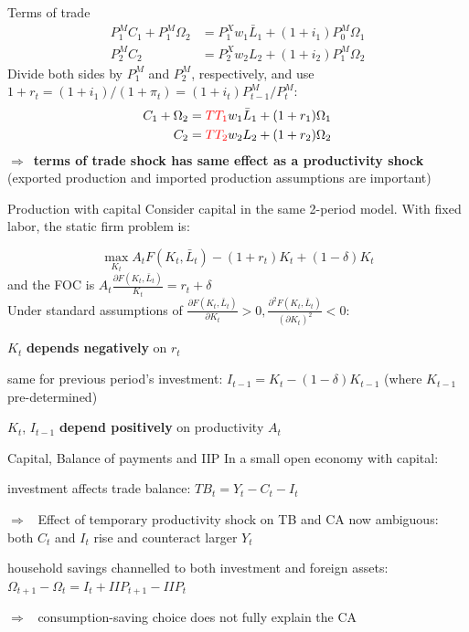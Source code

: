 \documentclass{beamer}
\newenvironment{mytemize}
{\vfill\itemize[nolistsep,itemsep=\fill,label=\color{blue}{$\triangleright$}]}
  {\enditemize}
\newenvironment{mynumerate}
{\vfill\enumerate[nolistsep,itemsep=\fill,label=\arabic*.]}
  {\endenumerate}
\newcommand{\rarr}{$\Rightarrow$\ }
\begin{document}
\begin{frame}{Terms of trade}
\begin{align*}
     P^M_1 C_1 + P_1^M \Omega_2  &= P^X_1 w_1 \bar L_1 + (1+i_1) P_0^M \Omega_1  \\
     P^M_2 C_2 & =  P^X_2 w_2 L_2  + (1+i_2) P_1^M \Omega_2
  \end{align*} 
  Divide both sides by \(P_1^M\) and \(P_2^M\),
respectively, and use
\(1+r_t = (1+i_1)/(1+\pi_t) = (1+i_t)P^M_{t-1}/P^M_t\): \begin{align*}
     C_1 + \Omega_2  &= \textcolor{red}{TT_1} w_1 \bar L_1 + (1+r_1) \Omega_1  \\
     C_2 & =  \textcolor{red}{TT_2} w_2 L_2  + (1+r_2) \Omega_2
  \end{align*} \rarr \textbf{terms of trade shock has same effect as a
  productivity shock} (exported production and imported production assumptions are important)
\end{frame}

\begin{frame}{Production with capital}
  Consider capital in the same 2-period model.
  With fixed labor, the static firm problem is:

  $$\max_{K_t} A_t F(K_t, \bar L_t) - (1+r_{t})K_t + (1-\delta)K_t $$
  and the FOC is $A_t \frac{\partial F(K_t, \bar L_t)}{K_t} =  r_t + \delta$ \\
\vfill 
Under standard assumptions of $\frac{\partial F(K_t, \bar L_t)}{\partial K_t} >0, \frac{\partial^2 F(K_t, \bar L_t)}{(\partial K_t)^2}<0$: 

\begin{mynumerate}
\item  $K_t$ \textbf{depends negatively} on $r_t$ 
\item same for previous period's investment: $I_{t-1} = K_{t} - (1-\delta)K_{t-1}$ (where $K_{t-1}$ pre-determined)
\item $K_t$, $I_{t-1}$ \textbf{depend positively} on productivity $A_t$
\end{mynumerate}


\end{frame}

\begin{frame}{Capital, Balance of payments and IIP}
  In a small open economy with capital:  
  \begin{mynumerate}
  \item investment affects trade balance: $TB_t = Y_t - C_t - I_t$
	\begin{mytemize}
	  \item[\rarr] Effect of temporary productivity shock on TB and CA now ambiguous: both $C_t$ and $I_t$ rise and counteract larger $Y_t$
	\end{mytemize}
  \item household savings channelled to both investment and foreign assets: $\Omega_{t+1} - \Omega_t = I_t + IIP_{t+1} - IIP_t$
	\begin{mytemize}
	  \item[\rarr] consumption-saving choice does not fully explain the CA
	\end{mytemize}
  \end{mynumerate}
\end{frame}
\end{document}
